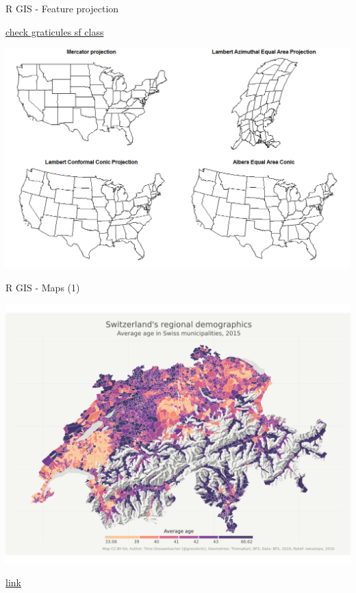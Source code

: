 \documentclass[8pt,ignorenonframetext,]{beamer}
\begin{document}
\begin{frame}{R GIS - Feature projection}

\href{http://r-spatial.org/r/2017/01/12/newssf.html}{check graticules sf
class}

\includegraphics{imgPres/R_GIS_projection.png}

\end{frame}

\begin{frame}{R GIS - Maps (1)}

\includegraphics{imgPres/demo/R_as_a_GIS.png}

\href{https://timogrossenbacher.ch/2016/12/beautiful-thematic-maps-with-ggplot2-only/}{link}

\end{frame}
\end{document}
